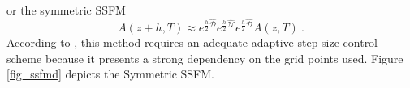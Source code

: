         or the symmetric SSFM \citep{sinkin}
        \begin{equation}\label{eq_azh2}
            A(z+h, T) \approx e^{\frac{h}{2}\hat{\mathcal{D}}} e^{\frac{h}{2}\hat{\mathcal{N}}} e^{\frac{h}{2}\hat{\mathcal{D}}} A(z,T) \ .
        \end{equation} According to \citep{Balac2013OverviewOA}, this method requires an adequate adaptive step-size control scheme because it presents a strong dependency on the grid points used. Figure \ref{fig_ssfmd} depicts the Symmetric SSFM.
        
        
        
        
         \begin{figure}[label={fig_ssfmd}, caption={Sketch of a Symmetric SSFM. Adapted from \citep{Balac2013OverviewOA}.}]
                \centering  
        
        \begin{tikzpicture}[x=1.2pt,y=1.2pt,yscale=-1,xscale=1]
            

\end{tikzpicture}
\end{figure}
